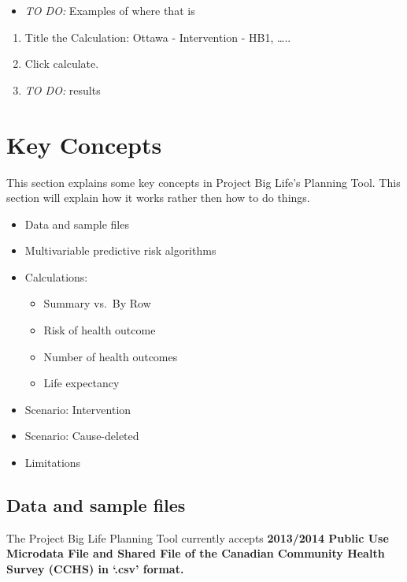 \documentclass[]{book}
\providecommand{\tightlist}{%
  \setlength{\itemsep}{0pt}\setlength{\parskip}{0pt}}
\begin{document}
\begin{itemize}
\tightlist
\item
  \emph{TO DO: } Examples of where that is
\end{itemize}

\begin{enumerate}
\def\labelenumi{\arabic{enumi}.}
\setcounter{enumi}{5}
\item
  Title the Calculation: Ottawa - Intervention - HB1, \ldots{}..
\item
  Click calculate.
\item
  \emph{TO DO:} results
\end{enumerate}

\chapter{Key Concepts}\label{keyconcepts}

This section explains some key concepts in Project Big Life's Planning
Tool. This section will explain how it works rather then how to do
things.

\begin{itemize}
\item
  Data and sample files
\item
  Multivariable predictive risk algorithms
\item
  Calculations:

  \begin{itemize}
  \tightlist
  \item
    Summary vs.~By Row
  \item
    Risk of health outcome
  \item
    Number of health outcomes
  \item
    Life expectancy
  \end{itemize}
\item
  Scenario: Intervention
\item
  Scenario: Cause-deleted
\item
  Limitations
\end{itemize}

\section{Data and sample files}\label{data-and-sample-files}

The Project Big Life Planning Tool currently accepts \textbf{2013/2014
Public Use Microdata File and Shared File of the Canadian Community
Health Survey (CCHS) in `.csv' format.}
\end{document}
